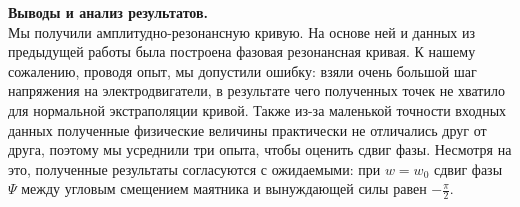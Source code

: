 \documentclass[a4paper]{article}
\begin{document}
{\parindent=0pt\textbf{Выводы и анализ результатов.}}\\
Мы получили амплитудно-резонансную кривую. На основе ней и данных из предыдущей работы была построена фазовая резонансная кривая. 
К нашему сожалению, проводя опыт, мы допустили ошибку: взяли очень большой шаг напряжения на электродвигатели, в результате чего полученных точек не хватило для нормальной экстраполяции кривой. Также из-за маленькой точности входных данных полученные физические величины практически не отличались друг от друга, поэтому мы усреднили три опыта, чтобы оценить сдвиг фазы. 
Несмотря на это, полученные результаты согласуются с ожидаемыми: при $w=w_0$ сдвиг фазы $\Psi$ между угловым смещением маятника и вынуждающей силы равен $-\frac{\pi}{2}$.

	
\end{document}
